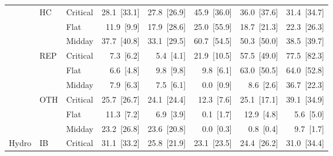 \begin{tabular}{l l l r r r r r}
 & HC & Critical & 28.1~{\color{seasoncol}\scriptsize[33.1]} & 27.8~{\color{seasoncol}\scriptsize[26.9]} & 45.9~{\color{seasoncol}\scriptsize[36.0]} & 36.0~{\color{seasoncol}\scriptsize[37.6]} & 31.4~{\color{seasoncol}\scriptsize[34.7]} \\
 &  & Flat & 11.9~{\color{seasoncol}\scriptsize[9.9]} & 17.9~{\color{seasoncol}\scriptsize[28.6]} & 25.0~{\color{seasoncol}\scriptsize[55.9]} & 18.7~{\color{seasoncol}\scriptsize[21.3]} & 22.3~{\color{seasoncol}\scriptsize[26.3]} \\
 &  & Midday & 37.7~{\color{seasoncol}\scriptsize[40.8]} & 33.1~{\color{seasoncol}\scriptsize[29.5]} & 60.7~{\color{seasoncol}\scriptsize[54.5]} & 50.3~{\color{seasoncol}\scriptsize[50.0]} & 38.5~{\color{seasoncol}\scriptsize[39.7]} \\
 & REP & Critical & 7.3~{\color{seasoncol}\scriptsize[6.2]} & 5.4~{\color{seasoncol}\scriptsize[4.1]} & 21.9~{\color{seasoncol}\scriptsize[10.5]} & 57.5~{\color{seasoncol}\scriptsize[49.0]} & 77.5~{\color{seasoncol}\scriptsize[82.3]} \\
 &  & Flat & 6.6~{\color{seasoncol}\scriptsize[4.8]} & 9.8~{\color{seasoncol}\scriptsize[9.8]} & 9.8~{\color{seasoncol}\scriptsize[6.1]} & 63.0~{\color{seasoncol}\scriptsize[50.5]} & 64.0~{\color{seasoncol}\scriptsize[52.8]} \\
 &  & Midday & 7.9~{\color{seasoncol}\scriptsize[6.3]} & 7.5~{\color{seasoncol}\scriptsize[6.1]} & 0.0~{\color{seasoncol}\scriptsize[0.9]} & 8.6~{\color{seasoncol}\scriptsize[2.6]} & 36.7~{\color{seasoncol}\scriptsize[22.3]} \\
 & OTH & Critical & 25.7~{\color{seasoncol}\scriptsize[26.7]} & 24.1~{\color{seasoncol}\scriptsize[24.4]} & 12.3~{\color{seasoncol}\scriptsize[7.6]} & 25.1~{\color{seasoncol}\scriptsize[17.1]} & 39.1~{\color{seasoncol}\scriptsize[34.9]} \\
 &  & Flat & 11.3~{\color{seasoncol}\scriptsize[7.2]} & 6.9~{\color{seasoncol}\scriptsize[3.9]} & 0.1~{\color{seasoncol}\scriptsize[1.7]} & 12.9~{\color{seasoncol}\scriptsize[4.8]} & 5.6~{\color{seasoncol}\scriptsize[5.0]} \\
 &  & Midday & 23.2~{\color{seasoncol}\scriptsize[26.8]} & 23.6~{\color{seasoncol}\scriptsize[20.8]} & 0.0~{\color{seasoncol}\scriptsize[0.3]} & 0.8~{\color{seasoncol}\scriptsize[0.4]} & 9.7~{\color{seasoncol}\scriptsize[1.7]} \\
\addlinespace
Hydro & IB & Critical & 31.1~{\color{seasoncol}\scriptsize[33.2]} & 25.8~{\color{seasoncol}\scriptsize[21.9]} & 23.1~{\color{seasoncol}\scriptsize[23.5]} & 24.4~{\color{seasoncol}\scriptsize[26.2]} & 31.0~{\color{seasoncol}\scriptsize[34.4]} \\

\end{tabular}
